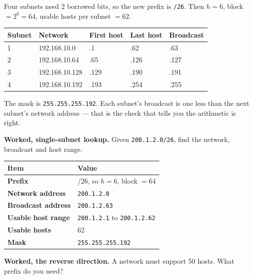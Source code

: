 \documentclass[11pt,a4paper]{article}
\begin{document}
\begin{solbox}
Four subnets need 2 borrowed bits, so the new prefix is \texttt{/26}. Then $h = 6$, block $= 2^6 = 64$, usable hosts per subnet $= 62$.

\begin{center}\small
\begin{tabular}{l l l l l}
\toprule Subnet & Network & First host & Last host & Broadcast\\
\midrule
1 & 192.168.10.0 & .1 & .62 & .63\\
2 & 192.168.10.64 & .65 & .126 & .127\\
3 & 192.168.10.128 & .129 & .190 & .191\\
4 & 192.168.10.192 & .193 & .254 & .255\\
\bottomrule
\end{tabular}
\end{center}

The mask is \texttt{255.255.255.192}. Each subnet's broadcast is one less than the next subnet's network address --- that is the check that tells you the arithmetic is right.
\end{solbox}

\begin{exambox}
\textbf{Worked, single-subnet lookup.} Given \texttt{200.1.2.0/26}, find the network, broadcast and host range.
\end{exambox}

\begin{center}\small
\begin{tabularx}{\textwidth}{>{\bfseries}p{} X}
\toprule Item & Value\\
\midrule
Prefix & /26, so $h = 6$, block $= 64$\\
Network address & \texttt{200.1.2.0}\\
Broadcast address & \texttt{200.1.2.63}\\
Usable host range & \texttt{200.1.2.1} to \texttt{200.1.2.62}\\
Usable hosts & 62\\
Mask & \texttt{255.255.255.192}\\
\bottomrule
\end{tabularx}
\end{center}

\begin{exambox}
\textbf{Worked, the reverse direction.} A network must support 50 hosts. What prefix do you need?
\end{exambox}
\end{document}
